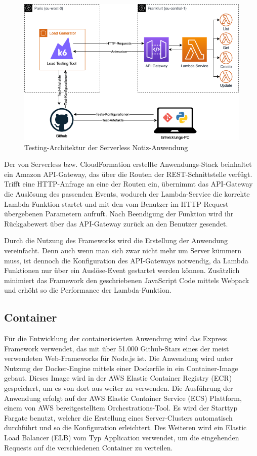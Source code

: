 \begin{figure}[H]
    \includegraphics[width=\textwidth]{img/serverless-testing-architektur.png}
    \caption[Testing-Architektur der Serverless Notiz-Anwendung]{Testing-Architektur der Serverless Notiz-Anwendung}
    \label{fig:serverless-testing-architektur}
\end{figure}

Der von Serverless bzw. CloudFormation erstellte Anwendungs-Stack beinhaltet ein Amazon API-Gateway, das über die Routen der REST-Schnittstelle verfügt. Trifft eine HTTP-Anfrage an eine der Routen ein, übernimmt das API-Gateway die Auslösung des passenden Events, wodurch der Lambda-Service die korrekte Lambda-Funktion startet und mit den vom Benutzer im HTTP-Request übergebenen Parametern aufruft. Nach Beendigung der Funktion wird ihr Rückgabewert über das API-Gateway zurück an den Benutzer gesendet.

Durch die Nutzung des Frameworks wird die Erstellung der Anwendung vereinfacht. Denn auch wenn man sich zwar nicht mehr um Server kümmern muss, ist dennoch die Konfiguration des API-Gateways notwendig, da Lambda Funktionen nur über ein Auslöse-Event gestartet werden können. Zusätzlich minimiert das Framework den geschriebenen JavaScript Code mittels Webpack und erhöht so die Performance der Lambda-Funktion.

\subsection{Container}
Für die Entwicklung der containerisierten Anwendung wird das Express Framework verwendet, das mit über 51.000 Github-Stars eines der meist verwendeten Web-Frameworks für Node.js ist. Die Anwendung wird unter Nutzung der Docker-Engine mittels einer Dockerfile in ein Container-Image gebaut. Dieses Image wird in der AWS Elastic Container Registry (ECR) gespeichert, um es von dort aus weiter zu verwenden. 
Die Ausführung der Anwendung erfolgt auf der AWS Elastic Container Service (ECS) Plattform, einem von AWS bereitgestelltem Orchestrations-Tool. Es wird der Starttyp Fargate benutzt, welcher die Erstellung eines Server-Clusters automatisch durchführt und so die Konfiguration erleichtert. Des Weiteren wird ein Elastic Load Balancer (ELB) vom Typ Application verwendet, um die eingehenden Requests auf die verschiedenen Container zu verteilen. 

